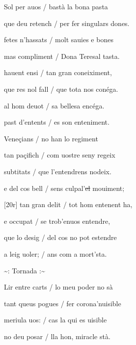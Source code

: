 \documentclass[12pt]{article}
\begin{document}
\begin{estrofa}

 Sol per auos / bast\`{a} la bona pasta

 que deu retench / per fer singulars dones.

 fetes n'hassats / molt sauies e bones

 mas compliment / Dona Teresal tasta.

 hauent ensi / tan gran coneiximent,

 que res nol fall / que tota nos con\'{e}ga.

 al hom deuot / sa bellesa enc\'{e}ga.

 past d'entents / es son enteniment.

\end{estrofa}



\begin{estrofa}

 Vene\c{c}ians / no han lo regiment

 tan pa\c{c}ifich / com uostre seny regeix

 subtitats / que l'entendrens nodeix.

 e del cos bell / sens culpal'\sout{el} mouiment;

 [20r] tan gran delit / tot hom entenent ha,

 e occupat / se trob'enuos entendre,

 que lo desig / del cos no pot estendre

 a leig uoler; / ans com a mort'sta.

\end{estrofa}


\begin{estrofaExtra}%




\begin{tornada}

\textasciitilde{}: Tornada
:\textasciitilde{}

\end{tornada}


\end{estrofaExtra}


\begin{estrofa}

 Lir entre carts / lo meu poder no s\`{a}

 tant queus pogues / fer corona'nuisible

 meriula uos: / cas la qui es uisible

 no deu posar / lla hon, miracle st\`{a}.

\end{estrofa}
\end{document}

